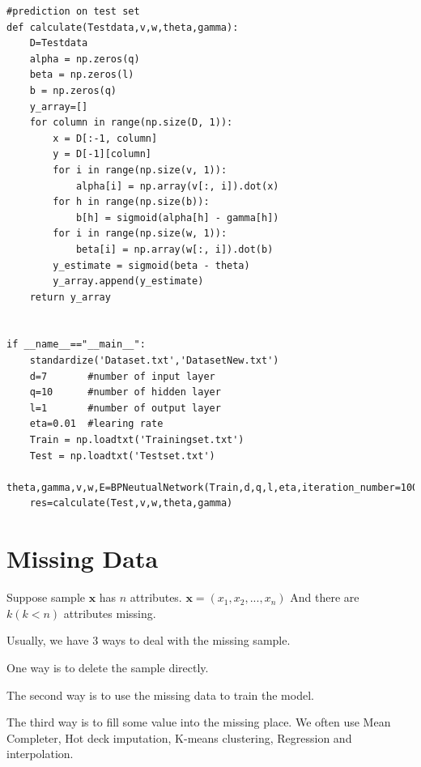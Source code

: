 \documentclass{article}
\begin{document}
\begin{scriptsize}
\begin{verbatim}
#prediction on test set
def calculate(Testdata,v,w,theta,gamma):
    D=Testdata
    alpha = np.zeros(q)
    beta = np.zeros(l)
    b = np.zeros(q)
    y_array=[]
    for column in range(np.size(D, 1)):
        x = D[:-1, column]
        y = D[-1][column]
        for i in range(np.size(v, 1)):
            alpha[i] = np.array(v[:, i]).dot(x)
        for h in range(np.size(b)):
            b[h] = sigmoid(alpha[h] - gamma[h])
        for i in range(np.size(w, 1)):
            beta[i] = np.array(w[:, i]).dot(b)
        y_estimate = sigmoid(beta - theta)
        y_array.append(y_estimate)
    return y_array


if __name__=="__main__":
    standardize('Dataset.txt','DatasetNew.txt')
    d=7       #number of input layer
    q=10      #number of hidden layer
    l=1       #number of output layer
    eta=0.01  #learing rate
    Train = np.loadtxt('Trainingset.txt')
    Test = np.loadtxt('Testset.txt')
    theta,gamma,v,w,E=BPNeutualNetwork(Train,d,q,l,eta,iteration_number=100)
    res=calculate(Test,v,w,theta,gamma)

\end{verbatim}
\end{scriptsize}
\section{Missing Data}
Suppose sample $\bm{x}$ has $n$ attributes. $\bm{x}=(x_{1},x_{2},...,x_{n})$
And there are $k(k<n)$ attributes missing.

Usually, we have 3 ways to deal with the missing sample.

One way is to delete the sample directly.

The second way is to use the missing data to train the model.

The third way is to fill some value into the missing place. We often use Mean Completer, Hot deck imputation, K-means clustering, Regression and interpolation.
\end{document}
